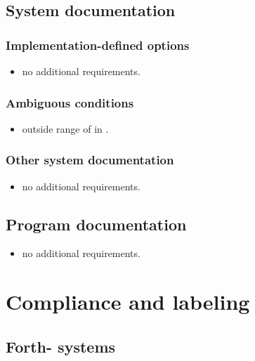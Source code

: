 \subsection{System documentation} %

\subsubsection{Implementation-defined options} %

\begin{itemize}
\item no additional requirements.
\end{itemize}

\subsubsection{Ambiguous conditions} %

\begin{itemize}
\item {} outside range of  in .
\end{itemize}

\subsubsection{Other system documentation} %

\begin{itemize}
\item no additional requirements.
\end{itemize}

\subsection{Program documentation} %

\begin{itemize}
\item no additional requirements.
\end{itemize}


\section{Compliance and labeling} %

\subsection{Forth-\snapshot{} systems} %


